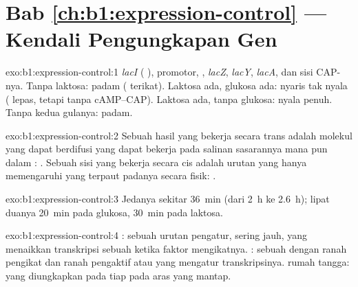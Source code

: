 \section*{Bab \ref{ch:b1:expression-control} --- Kendali Pengungkapan Gen}

\begin{solution}{exo:b1:expression-control:1}
\emph{lacI} ( ), promotor, , \emph{lacZ},
\emph{lacY}, \emph{lacA}, dan sisi CAP-nya. Tanpa laktosa: padam
( terikat). Laktosa ada, glukosa ada: nyaris tak nyala
( lepas, tetapi tanpa cAMP--CAP). Laktosa ada, tanpa glukosa:
nyala penuh. Tanpa kedua gulanya: padam.
\end{solution}

\begin{solution}{exo:b1:expression-control:2}
Sebuah hasil yang bekerja secara trans adalah molekul yang dapat
berdifusi yang dapat bekerja pada salinan sasarannya mana pun dalam
: . Sebuah sisi yang bekerja secara cis adalah urutan
 yang hanya memengaruhi  yang terpaut padanya secara fisik:
.
\end{solution}

\begin{solution}{exo:b1:expression-control:3}
Jedanya sekitar \qty{36}{min} (dari \qty{2}{h} ke \qty{2.6}{h}); lipat
duanya \qty{20}{min} pada glukosa, \qty{30}{min} pada laktosa.
\end{solution}

\begin{solution}{exo:b1:expression-control:4}
: sebuah urutan pengatur, sering jauh, yang menaikkan
transkripsi sebuah  ketika faktor mengikatnya. :
sebuah  dengan ranah pengikat  dan ranah pengaktif atau
 yang mengatur transkripsinya.  rumah tangga:  yang
diungkapkan pada tiap  pada aras yang mantap.
\end{solution}


